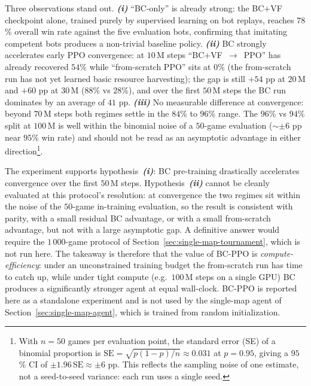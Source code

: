 Three observations stand out. \textbf{\emph{(i)}} ``BC-only'' is already strong: the BC+VF checkpoint alone, trained purely by supervised learning on bot replays, reaches $78$\% overall win rate against the five evaluation bots, confirming that imitating competent bots produces a non-trivial baseline policy. \textbf{\emph{(ii)}} BC strongly accelerates early PPO convergence: at $10\,\text{M}$ steps ``BC+VF~$\rightarrow$~PPO'' has already recovered $54$\% while ``from-scratch PPO'' sits at $0$\% (the from-scratch run has not yet learned basic resource harvesting); the gap is still $+54$ pp at $20\,\text{M}$ and $+60$ pp at $30\,\text{M}$ ($88$\% vs $28$\%), and over the first $50\,\text{M}$ steps the BC run dominates by an average of $41$ pp. \textbf{\emph{(iii)}} No measurable difference at convergence: beyond $70\,\text{M}$ steps both regimes settle in the $84$\% to $96$\% range. The $96$\% vs $94$\% split at $100\,\text{M}$ is well within the binomial noise of a $50$-game evaluation (${\sim}\pm 6$ pp near $95$\% win rate) and should not be read as an asymptotic advantage in either direction\footnote{With $n=50$ games per evaluation point, the standard error (SE) of a binomial proportion is $\mathrm{SE}=\sqrt{p(1-p)/n}\approx0.031$ at $p=0.95$, giving a $95$\% CI of $\pm1.96\,\mathrm{SE}\approx\pm6$ pp. This reflects the sampling noise of one estimate, not a seed-to-seed variance: each run uses a single seed.}.

\medskip

The experiment supports hypothesis~\textbf{\emph{(i)}}: BC pre-training drastically accelerates convergence over the first $50\,\text{M}$ steps. Hypothesis~\textbf{\emph{(ii)}} cannot be cleanly evaluated at this protocol's resolution: at convergence the two regimes sit within the noise of the $50$-game in-training evaluation, so the result is consistent with parity, with a small residual BC advantage, or with a small from-scratch advantage, but not with a large asymptotic gap. A definitive answer would require the $1\,000$-game protocol of Section~\ref{sec:single-map-tournament}, which is not run here. The takeaway is therefore that the value of BC-PPO is \emph{compute-efficiency}: under an unconstrained training budget the from-scratch run has time to catch up, while under tight compute (e.g.\ $100\,\text{M}$ steps on a single GPU) BC produces a significantly stronger agent at equal wall-clock. BC-PPO is reported here as a standalone experiment and is not used by the single-map  agent of Section~\ref{sec:single-map-agent}, which is trained from random initialization.


